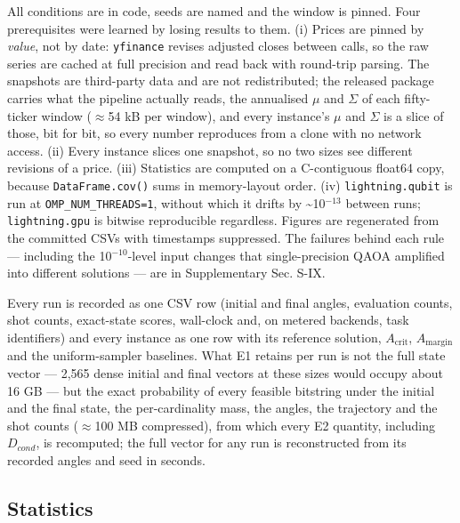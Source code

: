 \documentclass{ieeeaccess}
\begin{document}
All conditions are in code, seeds are named and the window is pinned. Four prerequisites were learned by losing results to them. (i) Prices are pinned by \textit{value}, not by date: \texttt{yfinance} revises adjusted closes between calls, so the raw series are cached at full precision and read back with round-trip parsing. The snapshots are third-party data and are not redistributed; the released package carries what the pipeline actually reads, the annualised $\mu$ and $\Sigma$ of each fifty-ticker window ($\approx$54 kB per window), and every instance's $\mu$ and $\Sigma$ is a slice of those, bit for bit, so every number reproduces from a clone with no network access. (ii) Every instance slices one snapshot, so no two sizes see different revisions of a price. (iii) Statistics are computed on a C-contiguous float64 copy, because \texttt{DataFrame.cov()} sums in memory-layout order. (iv) \texttt{lightning.qubit} is run at \texttt{OMP\_NUM\_THREADS=1}, without which it drifts by \~{}10$^{-13}$ between runs; \texttt{lightning.gpu} is bitwise reproducible regardless. Figures are regenerated from the committed CSVs with timestamps suppressed. The failures behind each rule --- including the 10$^{-10}$-level input changes that single-precision QAOA amplified into different solutions --- are in Supplementary Sec. S-IX.


Every run is recorded as one CSV row (initial and final angles, evaluation counts, shot counts, exact-state scores, wall-clock and, on metered backends, task identifiers) and every instance as one row with its reference solution, $A_{\mathrm{crit}}$, $A_{\mathrm{margin}}$ and the uniform-sampler baselines. What E1 retains per run is not the full state vector --- 2,565 dense initial and final vectors at these sizes would occupy about 16 GB --- but the exact probability of every feasible bitstring under the initial and the final state, the per-cardinality mass, the angles, the trajectory and the shot counts ($\approx$100 MB compressed), from which every E2 quantity, including $D_{cond}$, is recomputed; the full vector for any run is reconstructed from its recorded angles and seed in seconds.


\subsection{Statistics}
\end{document}
